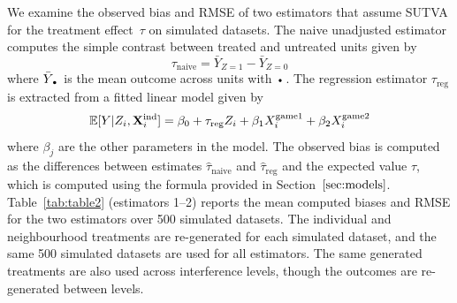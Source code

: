 \documentclass[10pt]{article}
\begin{document}
We examine the observed bias and RMSE of two estimators that assume SUTVA for the treatment effect~$\tau$ on simulated datasets. The naive unadjusted estimator computes the simple contrast between treated and untreated units given by
\[
\tau_\text{naive} = \bar{Y}_{Z=1} - \bar{Y}_{Z=0}
\]
where $\bar{Y}_{\argdot}$ is the mean outcome across units with $\argdot$. The regression estimator $\tau_\text{reg}$ \parencite{Imbens:2015} is extracted from a fitted linear model given by
\[
\mathbb{E}[Y|Z_i,\mathbf{X}^{\text{ind}}_i] = \beta_0 + \tau_\text{reg}Z_i + \beta_1X_i^\text{game1} + \beta_2X_i^\text{game2}
\]
where $\beta_j$ are the other parameters in the model. The observed bias is computed as the differences between estimates $\hat{\tau}_\text{naive}$ and $\hat{\tau}_\text{reg}$ and the expected value $\tau$, which is computed using the formula provided in Section~$\ref{sec:models}$. Table~\ref{tab:table2} (estimators 1--2) reports the mean computed biases and RMSE for the two estimators over 500 simulated datasets. The individual and neighbourhood treatments are re-generated for each simulated dataset, and the same 500 simulated datasets are used for all estimators. The same generated treatments are also used across interference levels, though the outcomes are re-generated between levels.
\\
\end{document}
